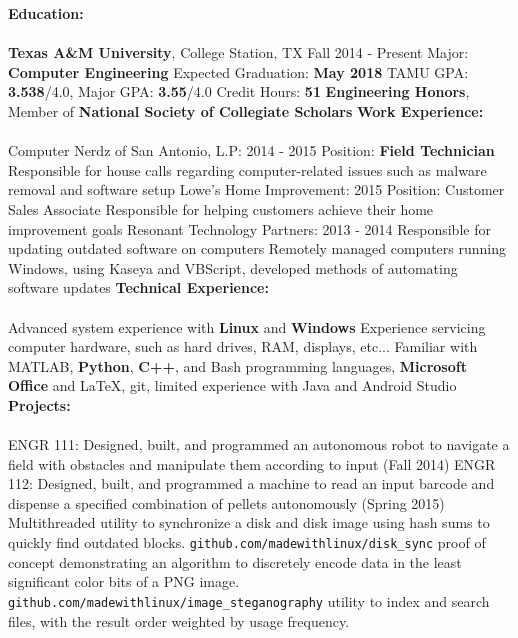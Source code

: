 \documentclass[12pt]{article}
\newcommand{\upspace}{\vspace{0.5px}}
\newcommand{\zzz}[1]{\upspace \0 \textbf{#1} \\ \vspace{-0.7\baselineskip} \hrulefill \vspace{-2px} \\ }
\newcommand{\aaa}{\upspace \1}
\newcommand{\bbb}{\upspace \2}
\begin{document}
\begin{flushleft}
\begin{outline}[compactitem]
\zzz{Education:}
	\aaa \textbf{Texas A\&M University}, College Station, TX \hfill Fall 2014 - Present
		\bbb Major: \textbf{Computer Engineering}
		\bbb Expected Graduation: \textbf{May 2018}
		\bbb TAMU GPA: \textbf{3.538}/4.0, Major GPA: \textbf{3.55}/4.0
		\bbb Credit Hours: \textbf{51}
		\bbb \textbf{Engineering Honors}, Member of \textbf{National Society of Collegiate Scholars}
\zzz{Work Experience:}
	\aaa Computer Nerdz of San Antonio, L.P: \hfill 2014 - 2015
		\bbb Position: \textbf{Field Technician}
		\bbb Responsible for house calls regarding computer-related issues such as malware removal and software setup
	\aaa Lowe's Home Improvement: \hfill 2015
		\bbb Position: Customer Sales Associate
		\bbb Responsible for helping customers achieve their home improvement goals
	\aaa Resonant Technology Partners: \hfill 2013 - 2014
		\bbb Responsible for updating outdated software on computers
		\bbb Remotely managed computers running Windows, using Kaseya and VBScript, developed methods of automating software updates
\zzz{Technical Experience:}
	\aaa Advanced system experience with \textbf{Linux} and \textbf{Windows}
	\aaa Experience servicing computer hardware, such as hard drives, RAM, displays, etc...
	\aaa Familiar with MATLAB, \textbf{Python}, \textbf{C++}, and Bash programming languages, \textbf{Microsoft Office} and LaTeX, git, limited experience with Java and Android Studio
\zzz{Projects:}
	\aaa ENGR 111: Designed, built, and programmed an autonomous robot to navigate a field with obstacles and manipulate them according to input (Fall 2014)
	\aaa ENGR 112: Designed, built, and programmed a machine to read an input barcode and dispense a specified combination of pellets autonomously (Spring 2015)
	\aaa Multithreaded utility to synchronize a disk and disk image using hash sums to quickly find outdated blocks.
		\verb|github.com/madewithlinux/disk_sync|
	\aaa proof of concept demonstrating an algorithm to discretely encode data in the least significant color bits of a PNG image.
		\verb|github.com/madewithlinux/image_steganography|
	\aaa utility to index and search files, with the result order weighted by usage frequency.

\end{outline}
\end{flushleft}
\end{document}
